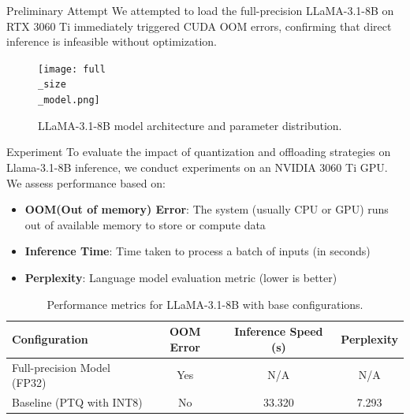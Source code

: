 \documentclass[final]{beamer}
\newlength{\colwidth}
\begin{document}
\begin{frame}[t]
\begin{columns}[t]
 \begin{column}{\colwidth}
  \begin{block}{Preliminary Attempt}
    We attempted to load the full-precision LLaMA-3.1-8B on RTX 3060 Ti immediately triggered CUDA OOM errors, confirming that direct inference is infeasible without optimization.
    \begin{figure}
      \centering
      \texttt{[image: full\\\_size\\\_model.png]}
      \caption{LLaMA-3.1-8B model architecture and parameter distribution.}
      \label{fig:model}
    \end{figure}
  \end{block}
  \vspace{-1em}

  \begin{block}{Experiment}
    To evaluate the impact of quantization and offloading strategies on Llama-3.1-8B inference, 
    we conduct experiments on an NVIDIA 3060 Ti GPU.
    We assess performance based on:
    \vspace{-0.5em}
    \begin{itemize}
      \item \textbf{OOM(Out of memory) Error}: The system (usually CPU or GPU) runs out of available memory to store or compute data
      \item \textbf{Inference Time}: Time taken to process a batch of inputs (in seconds)
      \item \textbf{Perplexity}: Language model evaluation metric (lower is better)
    \end{itemize}
    \vspace{-0.5em}
    \begin{table}
      \centering
      \caption{Performance metrics for LLaMA-3.1-8B with base configurations.}
      \fontsize{16}{8.2}
      \begin{tabular}{@{}L{15cm}ccc@{}}
        \toprule
        \textbf{Configuration} & \textbf{OOM Error} & \textbf{Inference Speed (s)} & \textbf{Perplexity}\\
        \midrule
        Full-precision Model (FP32) & Yes & N/A & N/A\\
        Baseline (PTQ with INT8) & No & 33.320 & 7.293 \\
        \bottomrule
    \end{tabular}
    \end{table}
   \end{block}


\end{column}
\end{columns}
\end{frame}
\end{document}

